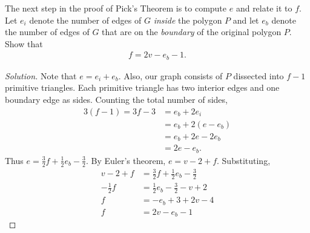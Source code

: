 \documentclass[12pt]{article}
\newenvironment{exercise}[2][Exercise]{\begin{trivlist}
        \item[\hskip \labelsep {\bfseries #1}\hskip \labelsep {\bfseries #2.}]}{\end{trivlist}}
\newenvironment{solution}
        {\begin{proof}[Solution]}
                    {\end{proof}}
\begin{document}
\begin{exercise}{59}
    The next step in the proof of Pick's Theorem is to compute \( e \) and relate it to \( f. \) Let \( e_{i} \) denote the number of edges of \( G \) \textit{inside} the polygon \( P \) and let \( e_{b} \) denote the number of edges of \( G \) that are on the \textit{boundary} of the original polygon \( P. \) Show that
    \begin{align*}
        f = 2v - e_{b} -1.
    \end{align*}
    \begin{solution}
        Note that \( e = e_{i} + e_{b} . \) Also, our graph consists of \( P \) dissected into \( f-1 \) primitive triangles. Each primitive triangle has two interior edges and one boundary edge as sides. Counting the total number of sides,
        \begin{align*}
            3(f-1) = 3f - 3 &= e_{b} + 2 e_{i} \\
            &= e_{b} + 2 (e - e_{b}) \\
            &= e_{b} + 2e - 2 e_{b} \\
            &= 2e - e_{b} .
        \end{align*}
        Thus \( e = \frac{3}{2} f + \frac{1}{2} e_{b} - \frac{3}{2}. \) By Euler's theorem, \( e = v-2+f . \) Substituting,
        \begin{align*}
            v-2+f &= \frac{3}{2} f + \frac{1}{2} e_{b} - \frac{3}{2} \\
            -\frac{1}{2} f &= \frac{1}{2} e_{b} - \frac{3}{2} -v +2\\
            f &= -e_{b} + 3 + 2v - 4\\
            f &= 2v - e_{b} -1
        \end{align*}
    \end{solution}
\end{exercise}
\end{document}

